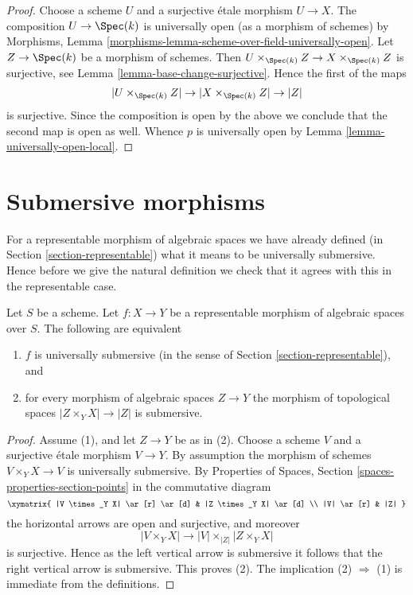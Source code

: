 \begin{proof}
Choose a scheme $U$ and a surjective \'etale morphism $U \to X$.
The composition $U \to \Spec(k)$ is universally open (as a morphism
of schemes) by
Morphisms, Lemma \ref{morphisms-lemma-scheme-over-field-universally-open}.
Let $Z \to \Spec(k)$ be a morphism of schemes. Then
$U \times_{\Spec(k)} Z \to X \times_{\Spec(k)} Z$ is surjective,
see
Lemma \ref{lemma-base-change-surjective}.
Hence the first of the maps
$$
|U \times_{\Spec(k)} Z| \to |X \times_{\Spec(k)} Z| \to |Z|
$$
is surjective. Since the composition is open by the above we conclude that
the second map is open as well. Whence $p$ is universally open by
Lemma \ref{lemma-universally-open-local}.
\end{proof}








\section{Submersive morphisms}
\label{section-submersive}

\noindent
For a representable morphism of algebraic spaces we have already defined (in
Section \ref{section-representable})
what it means to be universally submersive. Hence before we give the natural
definition we check that it agrees with this in the representable case.

\begin{lemma}
\label{lemma-characterize-representable-universally-submersive}
Let $S$ be a scheme. Let $f : X \to Y$ be a representable morphism of
algebraic spaces over $S$. The following are equivalent
\begin{enumerate}
\item $f$ is universally submersive
(in the sense of Section \ref{section-representable}), and
\item for every morphism of algebraic spaces $Z \to Y$ the morphism of
topological spaces $|Z \times_Y X| \to |Z|$ is submersive.
\end{enumerate}
\end{lemma}

\begin{proof}
Assume (1), and let $Z \to Y$ be as in (2). Choose a scheme $V$ and
a surjective \'etale morphism $V \to Y$. By assumption the morphism
of schemes $V \times_Y X \to V$ is universally submersive. By
Properties of Spaces, Section \ref{spaces-properties-section-points}
in the commutative diagram
$$
\xymatrix{
|V \times_Y X| \ar[r] \ar[d] & |Z \times_Y X| \ar[d] \\
|V| \ar[r] & |Z|
}
$$
the horizontal arrows are open and surjective, and moreover
$$
|V \times_Y X| \longrightarrow |V| \times_{|Z|} |Z \times_Y X|
$$
is surjective. Hence as the left vertical arrow is submersive
it follows that the right vertical arrow is submersive.
This proves (2). The implication (2) $\Rightarrow$ (1) is
immediate from the definitions.
\end{proof}


